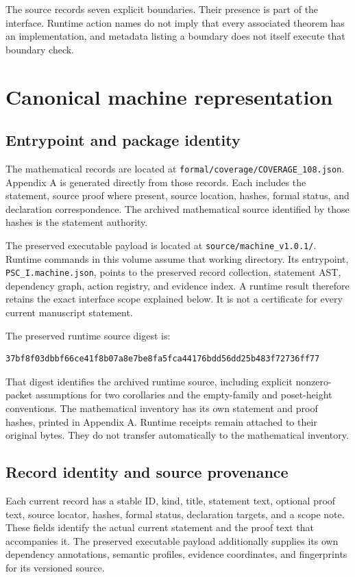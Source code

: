 \documentclass[a4paper,11pt]{article}
\begin{document}
The source records seven explicit boundaries. Their presence is part of the interface. Runtime action names do not imply that every associated theorem has an implementation, and metadata listing a boundary does not itself execute that boundary check.

\section{Canonical machine representation}
\subsection{Entrypoint and package identity}
The mathematical records are located at \nolinkurl{formal/coverage/COVERAGE_108.json}. Appendix A is generated directly from those records. Each includes the statement, source proof where present, source location, hashes, formal status, and declaration correspondence. The archived mathematical source identified by those hashes is the statement authority.

The preserved executable payload is located at \nolinkurl{source/machine_v1.0.1/}. Runtime commands in this volume assume that working directory. Its entrypoint, \nolinkurl{PSC_I.machine.json}, points to the preserved record collection, statement AST, dependency graph, action registry, and evidence index. A runtime result therefore retains the exact interface scope explained below. It is not a certificate for every current manuscript statement.

The preserved runtime source digest is:
\begin{lstlisting}
37bf8f03dbbf66ce41f8b07a8e7be8fa5fca44176bdd56dd25b483f72736ff77
\end{lstlisting}
That digest identifies the archived runtime source, including explicit nonzero-packet assumptions for two corollaries and the empty-family and poset-height conventions. The mathematical inventory has its own statement and proof hashes, printed in Appendix A. Runtime receipts remain attached to their original bytes. They do not transfer automatically to the mathematical inventory.
\subsection{Record identity and source provenance}
Each current record has a stable ID, kind, title, statement text, optional proof text, source locator, hashes, formal status, declaration targets, and a scope note. These fields identify the actual current statement and the proof text that accompanies it. The preserved executable payload additionally supplies its own dependency annotations, semantic profiles, evidence coordinates, and fingerprints for its versioned source.
\end{document}
